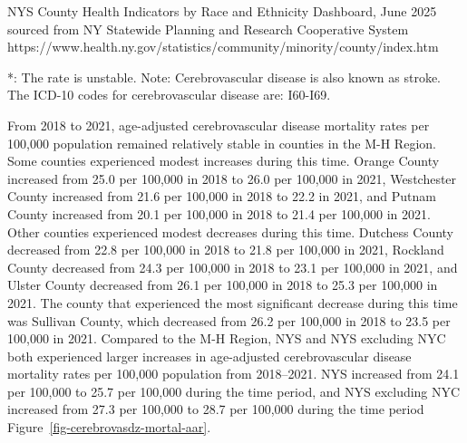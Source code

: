\documentclass[
  english,
  letterpaper,
]{report}
\begin{document}
\begin{tcolorbox}[enhanced jigsaw, breakable, leftrule=.75mm, title=\textcolor{quarto-callout-note-color}{\faInfo}\hspace{0.5em}{Source}, bottomrule=.15mm, opacityback=0, left=2mm, colback=white, bottomtitle=1mm, coltitle=black, colbacktitle=quarto-callout-note-color!10!white, colframe=quarto-callout-note-color-frame, opacitybacktitle=0.6, toptitle=1mm, titlerule=0mm, arc=.35mm, rightrule=.15mm, toprule=.15mm]

NYS County Health Indicators by Race and Ethnicity Dashboard, June 2025
sourced from NY Statewide Planning and Research Cooperative System
https://www.health.ny.gov/statistics/community/minority/county/index.htm

\end{tcolorbox}

\begin{tcolorbox}[enhanced jigsaw, breakable, leftrule=.75mm, title=\textcolor{quarto-callout-note-color}{\faInfo}\hspace{0.5em}{Note}, bottomrule=.15mm, opacityback=0, left=2mm, colback=white, bottomtitle=1mm, coltitle=black, colbacktitle=quarto-callout-note-color!10!white, colframe=quarto-callout-note-color-frame, opacitybacktitle=0.6, toptitle=1mm, titlerule=0mm, arc=.35mm, rightrule=.15mm, toprule=.15mm]

*: The rate is unstable. Note: Cerebrovascular disease is also known as
stroke. The ICD-10 codes for cerebrovascular disease are: I60-I69.

\end{tcolorbox}

From 2018 to 2021, age-adjusted cerebrovascular disease mortality rates
per 100,000 population remained relatively stable in counties in the M-H
Region. Some counties experienced modest increases during this time.
Orange County increased from 25.0 per 100,000 in 2018 to 26.0 per
100,000 in 2021, Westchester County increased from 21.6 per 100,000 in
2018 to 22.2 in 2021, and Putnam County increased from 20.1 per 100,000
in 2018 to 21.4 per 100,000 in 2021. Other counties experienced modest
decreases during this time. Dutchess County decreased from 22.8 per
100,000 in 2018 to 21.8 per 100,000 in 2021, Rockland County decreased
from 24.3 per 100,000 in 2018 to 23.1 per 100,000 in 2021, and Ulster
County decreased from 26.1 per 100,000 in 2018 to 25.3 per 100,000 in
2021. The county that experienced the most significant decrease during
this time was Sullivan County, which decreased from 26.2 per 100,000 in
2018 to 23.5 per 100,000 in 2021. Compared to the M-H Region, NYS and
NYS excluding NYC both experienced larger increases in age-adjusted
cerebrovascular disease mortality rates per 100,000 population from
2018--2021. NYS increased from 24.1 per 100,000 to 25.7 per 100,000
during the time period, and NYS excluding NYC increased from 27.3 per
100,000 to 28.7 per 100,000 during the time period
Figure~\ref{fig-cerebrovasdz-mortal-aar}.
\end{document}
